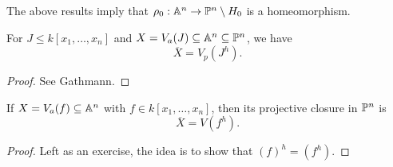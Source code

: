 \begin{remark}
  The above results imply that
  $\rho_0 : \mathbb{A}^n \to \mathbb{P}^n \setminus H_0$
  is a homeomorphism.
\end{remark}

\begin{prop}
  For $J \le k[x_1, \dots, x_n]$
  and $X = V_a(J) \subseteq \mathbb{A}^n \subseteq \mathbb{P}^n$,
  we have
  \[
    \overline{X} = V_p(J^h).
  \]
\end{prop}

\begin{proof}
  See Gathmann.
\end{proof}

\begin{prop}
  If $X = V_a(f) \subseteq \mathbb{A}^n$ with $f \in k[x_1, \dots, x_n]$,
  then its projective closure
  in $\mathbb{P}^n$ is
  \[
    \overline{X} = V(f^h).
  \]
\end{prop}

\begin{proof}
  Left as an exercise, the idea
  is to show that
  $(f)^h = (f^h)$.
\end{proof}
